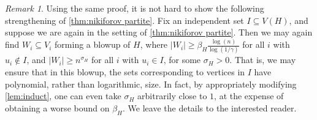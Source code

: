 \documentclass[11pt]{article}
\numberwithin{equation}{section}
\theoremstyle{plain}
\theoremstyle{remark}
\newtheorem*{remark}{Remark}
\newcommand\ab[1]{\lvert #1 \rvert}
\begin{document}
\begin{remark}
    Using the same proof, it is not hard to show the following strengthening of \cref{thm:nikiforov partite}. Fix an independent set $I \subseteq V(H)$, and suppose we are again in the setting of \cref{thm:nikiforov partite}. Then we may again find $W_i \subseteq V_i$ forming a blowup of $H$, where $\ab{W_i} \geq \beta_H \frac{\log(n)}{\log(1/\gamma)}$ for all $i$ with $u_i \notin I$, and $\ab{W_i}\geq n^{\sigma_H}$ for all $i$ with $u_i \in I$, for some $\sigma_H>0$. That is, we may ensure that in this blowup, the sets corresponding to vertices in $I$ have polynomial, rather than logarithmic, size. In fact, by appropriately modifying \cref{lem:induct}, one can even take $\sigma_H$ arbitrarily close to $1$, at the expense of obtaining a worse bound on $\beta_H$. We leave the details to the interested reader.
\end{remark}
\end{document}
